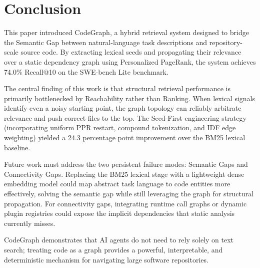 \section{Conclusion}
\label{sec:conclusion}

This paper introduced CodeGraph, a hybrid retrieval system designed to bridge the Semantic Gap between natural-language task descriptions and repository-scale source code. By extracting lexical seeds and propagating their relevance over a static dependency graph using Personalized PageRank, the system achieves 74.0\% Recall@10 on the SWE-bench Lite benchmark.

The central finding of this work is that structural retrieval performance is primarily bottlenecked by Reachability rather than Ranking. When lexical signals identify even a noisy starting point, the graph topology can reliably arbitrate relevance and push correct files to the top. The Seed-First engineering strategy (incorporating uniform PPR restart, compound tokenization, and IDF edge weighting) yielded a 24.3 percentage point improvement over the BM25 lexical baseline.

Future work must address the two persistent failure modes: Semantic Gaps and Connectivity Gaps. Replacing the BM25 lexical stage with a lightweight dense embedding model could map abstract task language to code entities more effectively, solving the semantic gap while still leveraging the graph for structural propagation. For connectivity gaps, integrating runtime call graphs or dynamic plugin registries could expose the implicit dependencies that static analysis currently misses. 

CodeGraph demonstrates that AI agents do not need to rely solely on text search; treating code as a graph provides a powerful, interpretable, and deterministic mechanism for navigating large software repositories.
